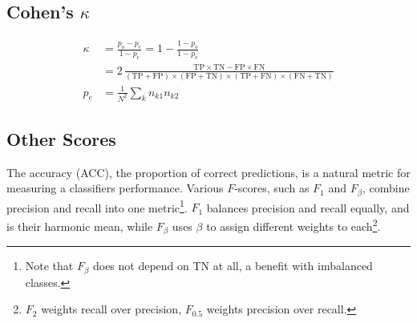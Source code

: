 \subsection{Cohen's \texorpdfstring{$\kappa$}{Kappa}}
\label{ml_general:eval:cohens_kappa}

\begin{subequations} \label{eq:cohens_kappa}
\begin{align}
\kappa &= \frac{p_{o} - p_{e}}{1-p_{e}} = 1 - \frac{1-p_{o}}{1-p_{e}} \label{eq:cohens_kappa:def} \\
&= 2\, \frac{\text{TP} \times \text{TN} - \text{FP} \times \text{FN} }{ \left(\text{TP} + \text{FP}\right) \times \left(\text{FP} + \text{TN}\right) \times \left(\text{TP} + \text{FN}\right) \times \left(\text{FN} + \text{TN}\right) } \label{eq:cohens_kappa:cm} \\
p_{e} &= \frac{1}{N^{2}} \sum_{k} n_{k1} n_{k2} \label{eq:cohens_kappa:pe}
\end{align}
\end{subequations}

\subsection{Other Scores}
\label{ml_general:eval:other_scores}

The accuracy (ACC), the proportion of correct predictions, is a natural metric for measuring a classifiers performance.
Various $F$-scores, such as $F_{1}$ and $F_{\beta}$, combine precision and recall
into one metric\footnote{Note that $F_{\beta}$ does not depend on TN at all, a benefit with imbalanced classes.}.
$F_{1}$ balances precision and recall equally, and is their harmonic mean,
while $F_{\beta}$ uses $\beta$ to assign different weights to each\footnote{$F_{2}$ weights recall over precision, $F_{0.5}$ weights precision over recall.}.

